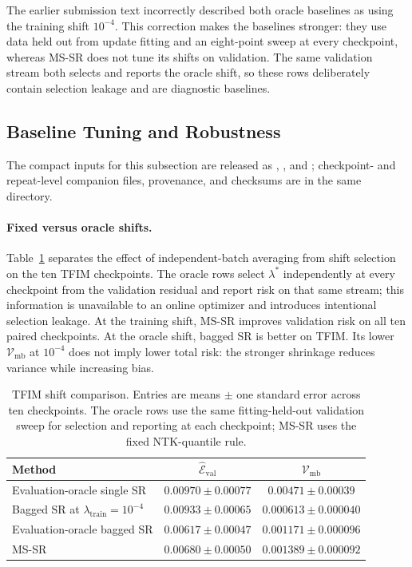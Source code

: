 The earlier submission text incorrectly described both oracle baselines as
using the training shift $10^{-4}$. This correction makes the baselines
stronger: they use data held out from update fitting and an eight-point sweep
at every checkpoint, whereas MS-SR does not tune its shifts on validation.
The same validation stream both selects and reports the oracle shift, so these
rows deliberately contain selection leakage and are diagnostic baselines.

\subsection{Baseline Tuning and Robustness}\label{app:mssr_robustness}

The compact inputs for this subsection are released as
,
, and
; checkpoint- and
repeat-level companion files, provenance, and checksums are in the same
 directory.

\paragraph{Fixed versus oracle shifts.}
Table~\ref{tab:tfim_shift_robustness} separates the effect of independent-batch
averaging from shift selection on the ten TFIM checkpoints. The oracle rows
select $\lambda^*$ independently at every checkpoint from the validation
residual and report risk on that same stream; this information is unavailable
to an online optimizer and introduces intentional selection leakage.
At the training shift, MS-SR improves validation risk on all ten paired
checkpoints. At the oracle shift, bagged SR is better on TFIM. Its lower
$\mathcal V_{\mathrm{mb}}$ at $10^{-4}$ does not imply lower total risk:
the stronger shrinkage reduces variance while increasing bias.

\begin{table}[h]
\centering
\small
\begin{tabular}{lcc}
\toprule
Method & $\widehat{\mathcal E}_{\mathrm{val}}$ & $\mathcal V_{\mathrm{mb}}$ \\
\midrule
Evaluation-oracle single SR
  & $0.00970\mathbin{\pm}0.00077$ & $0.00471\mathbin{\pm}0.00039$ \\
Bagged SR at $\lambda_{\mathrm{train}}=10^{-4}$
  & $0.00933\mathbin{\pm}0.00065$ & $0.000613\mathbin{\pm}0.000040$ \\
Evaluation-oracle bagged SR
  & $0.00617\mathbin{\pm}0.00047$ & $0.001171\mathbin{\pm}0.000096$ \\
MS-SR
  & $0.00680\mathbin{\pm}0.00050$ & $0.001389\mathbin{\pm}0.000092$ \\
\bottomrule
\end{tabular}
\caption{TFIM shift comparison. Entries are means $\mathbin{\pm}$ one
standard error across ten checkpoints. The oracle rows use the same
fitting-held-out validation sweep for selection and reporting at each
checkpoint; MS-SR uses the fixed NTK-quantile rule.}
\label{tab:tfim_shift_robustness}
\end{table}

